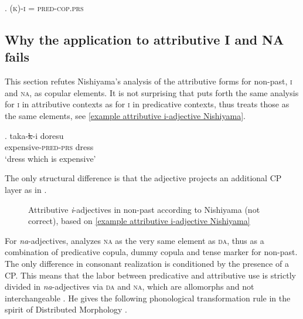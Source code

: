 \ex. \textsc{(k)-i} = \textsc{pred-cop.prs}

\subsection{Why the application to attributive I and NA fails} \label{why it fails}

This section refutes Nishiyama's analysis of the attributive forms for non-past, \textsc{i} and \textsc{na}, as copular elements. It is not surprising that \citet{nishiyama:1999:adj} puts forth the same analysis for \textsc{i} in attributive contexts as for \textsc{i} in predicative contexts, thus treats those as the same elements, see \ref{example attributive i-adjective Nishiyama}.

\exg. taka-\st{k}-i doresu\\
expensive-\textsc{pred-prs} dress\\
`dress which is expensive' \label{example attributive i-adjective Nishiyama}

The only structural difference is that the adjective projects an additional CP layer as in  \citep[199–202]{nishiyama:1999:adj}.

\begin{figure}
\centering
\caption{Attributive \textit{i}-adjectives in non-past according to Nishiyama (not correct), based on \ref{example attributive i-adjective Nishiyama}}
\label{attributive i-adjective non-past tree wrong}
\end{figure}

For \textit{na}-adjectives, \citet[196–199]{nishiyama:1999:adj} analyzes \textsc{na} as the very same element as \textsc{da}, thus as a combination of predicative copula, dummy copula and tense marker for non-past. The only difference in consonant realization is conditioned by the presence of a CP. This means that the labor between predicative and attributive use is strictly divided in \textit{na}-adjectives via \textsc{da} and \textsc{na}, which are allomorphs and not interchangeable \citep[197]{nishiyama:1999:adj}. He gives the following phonological transformation rule in the spirit of Distributed Morphology \citep{halle:1993:distributed, halle:1994:some}. 

